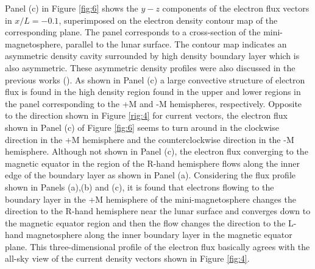 \documentclass[draft,jgrga]{agutex2015}
\begin{document}
\begin{article}
Panel (c) in Figure \ref{fig:6} shows the $y-z$ components of the electron flux 
vectors in $x/L=-0.1$, 
superimposed on the electron density contour map of the corresponding plane.
The panel corresponds to a cross-section of the mini-magnetosphere, 
parallel to the lunar surface.
The contour map indicates an asymmetric density cavity 
surrounded by high density boundary layer which is also asymmetric.
These asymmetric density profiles were also discussed in the previous works
(\cite{Deca2014}).
As shown in Panel (c)
a large convective structure of electron flux is found 
in the high density region found in the upper and lower regions in the panel
corresponding to the +M and -M hemispheres, respectively.
%
%
Opposite to the direction shown in Figure \ref{rig:4} for current vectors,
the electron flux shown in Panel (c) of Figure \ref{fig:6} seems to turn 
around in the clockwise direction in the +M hemisphere and the 
counterclockwise direction in the -M hemisphere.
%
Although not shown in Panel (c), 
the electron flux converging to the magnetic equator in the region of
the R-hand hemisphere flows along the inner edge of the boundary layer 
as shown in Panel (a).
Considering the flux profile shown in Panels (a),(b) and (c), 
it is found that electrons flowing 
to the boundary layer in the +M hemisphere of the mini-magnetosphere
changes the direction to the R-hand hemisphere 
near the lunar surface and converges down to the magnetic equator region 
and then the flow changes the direction to the L-hand magnetosphere
along the inner boundary layer in the magnetic equator plane.
This three-dimensional profile of the electron flux basically 
agrees with the all-sky view of the current density vectors 
shown in Figure \ref{fig:4}.


\end{article}
\end{document}
